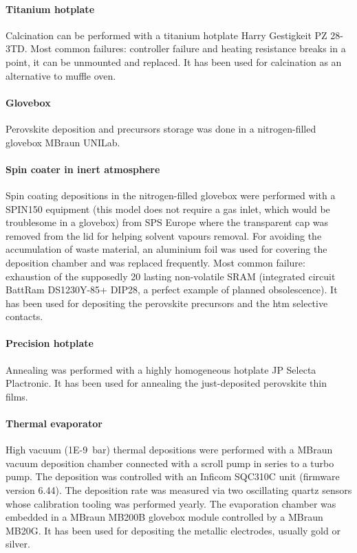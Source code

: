 \paragraph{Titanium hotplate} Calcination can be performed with a titanium hotplate Harry Gestigkeit PZ 28-3TD.
Most common failures: controller failure and heating resistance breaks in a point, it can be unmounted and replaced.
It has been used for calcination as an alternative to muffle oven.

\paragraph{Glovebox} Perovskite deposition and precursors storage was done in a nitrogen-filled glovebox MBraun UNILab.

\paragraph{Spin coater in inert atmosphere} Spin coating depositions in the nitrogen-filled glovebox were performed with a SPIN150 equipment (this model does not require a gas inlet, which would be troublesome in a glovebox) from SPS Europe where the transparent cap was removed from the lid for helping solvent vapours removal. For avoiding the accumulation of waste material, an aluminium foil was used for covering the deposition chamber and was replaced frequently.
Most common failure: exhaustion of the supposedly \SI{20}{\year} lasting non-volatile SRAM (integrated circuit BattRam DS1230Y-85+ DIP28, a perfect example of planned obsolescence).
It has been used for depositing the perovskite precursors and the \gls{htm} selective contacts.

\paragraph{Precision hotplate} Annealing was performed with a highly homogeneous hotplate JP Selecta Plactronic.
It has been used for annealing the just-deposited perovskite thin films.

\paragraph{Thermal evaporator} High vacuum (\SI{1E-9}{\bar}) thermal depositions were performed with a MBraun vacuum deposition chamber connected with a scroll pump in series to a turbo pump. The deposition was controlled with an Inficom SQC310C unit (firmware version 6.44). The deposition rate was measured via two oscillating quartz sensors whose calibration tooling was performed yearly. The evaporation chamber was embedded in a MBraun MB200B glovebox module controlled by a MBraun MB20G. %
It has been used for depositing the metallic electrodes, usually gold or silver.

